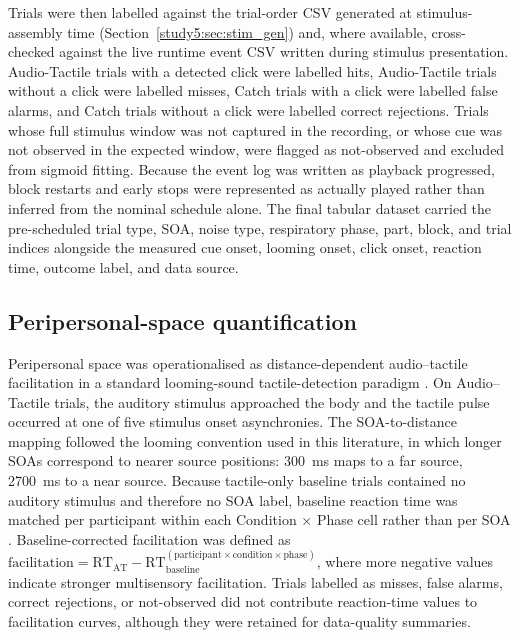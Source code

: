 Trials were then labelled against the trial-order CSV generated at stimulus-assembly time (Section~\ref{study5:sec:stim_gen}) and, where available, cross-checked against the live runtime event CSV written during stimulus presentation. Audio-Tactile trials with a detected click were labelled hits, Audio-Tactile trials without a click were labelled misses, Catch trials with a click were labelled false alarms, and Catch trials without a click were labelled correct rejections. Trials whose full stimulus window was not captured in the recording, or whose cue was not observed in the expected window, were flagged as not-observed and excluded from sigmoid fitting. Because the event log was written as playback progressed, block restarts and early stops were represented as actually played rather than inferred from the nominal schedule alone. The final tabular dataset carried the pre-scheduled trial type, SOA, noise type, respiratory phase, part, block, and trial indices alongside the measured cue onset, looming onset, click onset, reaction time, outcome label, and data source.

\subsection{Peripersonal-space quantification}

Peripersonal space was operationalised as distance-dependent audio--tactile facilitation in a standard looming-sound tactile-detection paradigm \citep{Canzoneri2012, teneggi2013social, noel2015peripersonal}. On Audio--Tactile trials, the auditory stimulus approached the body and the tactile pulse occurred at one of five stimulus onset asynchronies. The SOA-to-distance mapping followed the looming convention used in this literature, in which longer SOAs correspond to nearer source positions: 300~ms maps to a far source, 2700~ms to a near source. Because tactile-only baseline trials contained no auditory stimulus and therefore no SOA label, baseline reaction time was matched per participant within each Condition $\times$ Phase cell rather than per SOA \citep{teneggi2013social, noel2015peripersonal}. Baseline-corrected facilitation was defined as $\mathrm{facilitation} = \mathrm{RT}_{\mathrm{AT}} - \mathrm{RT}_{\mathrm{baseline}}^{(\mathrm{participant} \times \mathrm{condition} \times \mathrm{phase})}$, where more negative values indicate stronger multisensory facilitation. Trials labelled as misses, false alarms, correct rejections, or not-observed did not contribute reaction-time values to facilitation curves, although they were retained for data-quality summaries.

